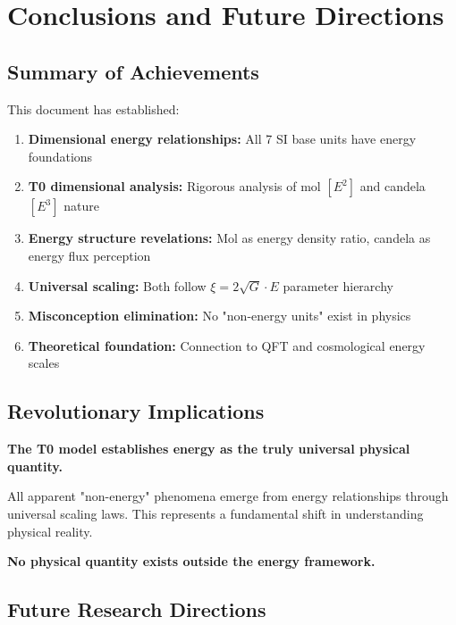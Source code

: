 \documentclass[12pt,a4paper]{article}
\newcommand{\xipar}{\xi}
\begin{document}
\section{Conclusions and Future Directions}
\label{sec:conclusions}

\subsection{Summary of Achievements}
\label{subsec:summary_achievements}

This document has established:

\begin{enumerate}
	\item \textbf{Dimensional energy relationships:} All 7 SI base units have energy foundations
	\item \textbf{T0 dimensional analysis:} Rigorous analysis of mol $[E^2]$ and candela $[E^3]$ nature
	\item \textbf{Energy structure revelations:} Mol as energy density ratio, candela as energy flux perception
	\item \textbf{Universal scaling:} Both follow $\xipar = 2\sqrt{G} \cdot E$ parameter hierarchy
	\item \textbf{Misconception elimination:} No "non-energy units" exist in physics
	\item \textbf{Theoretical foundation:} Connection to QFT and cosmological energy scales
\end{enumerate}

\subsection{Revolutionary Implications}
\label{subsec:revolutionary_implications}

\begin{tcolorbox}[colback=red!5!white,colframe=red!75!black,title=Paradigm Shift: Universal Energy Physics]
	\textbf{The T0 model establishes energy as the truly universal physical quantity.}
	
	All apparent "non-energy" phenomena emerge from energy relationships through universal scaling laws. This represents a fundamental shift in understanding physical reality.
	
	\textbf{No physical quantity exists outside the energy framework.}
\end{tcolorbox}

\subsection{Future Research Directions}
\label{subsec:future_research}
\end{document}
